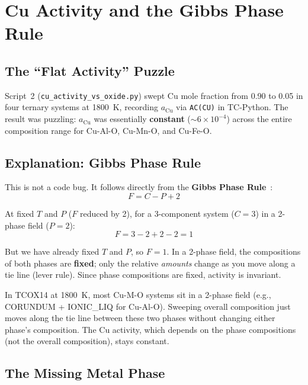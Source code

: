 \documentclass[11pt]{article}
\begin{document}
\section{Cu Activity and the Gibbs Phase Rule}

\subsection{The ``Flat Activity'' Puzzle}

Script~2 (\texttt{cu\_activity\_vs\_oxide.py}) swept Cu mole fraction from 0.90 to 0.05 in four ternary systems at \SI{1800}{\kelvin}, recording $a_{\text{Cu}}$ via \texttt{AC(CU)} in TC-Python. The result was puzzling: $a_{\text{Cu}}$ was essentially \textbf{constant} ($\sim 6 \times 10^{-4}$) across the entire composition range for Cu-Al-O, Cu-Mn-O, and Cu-Fe-O.

\subsection{Explanation: Gibbs Phase Rule}

This is not a code bug. It follows directly from the \textbf{Gibbs Phase Rule}~\cite{Gaskell2024, Brown2026TC1}:
\[
    F = C - P + 2
\]

At fixed $T$ and $P$ ($F$ reduced by 2), for a 3-component system ($C = 3$) in a 2-phase field ($P = 2$):
\[
    F = 3 - 2 + 2 - 2 = 1
\]

But we have already fixed $T$ and $P$, so $F = 1$. In a 2-phase field, the compositions of both phases are \textbf{fixed}; only the relative \textit{amounts} change as you move along a tie line (lever rule). Since phase compositions are fixed, activity is invariant.

\begin{insight}
In TCOX14 at \SI{1800}{\kelvin}, most Cu-M-O systems sit in a 2-phase field (e.g., CORUNDUM + IONIC\_LIQ for Cu-Al-O). Sweeping overall composition just moves along the tie line between these two phases without changing either phase's composition. The Cu activity, which depends on the phase compositions (not the overall composition), stays constant.
\end{insight}

\subsection{The Missing Metal Phase}
\end{document}
